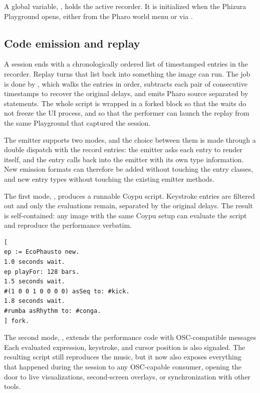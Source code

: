 \documentclass[
]{ceurart}
\begin{document}
A global variable, , holds the active recorder.
It is initialized when the Phizura Playground opens, either from the Pharo world menu or via .

\subsection{Code emission and replay}

A session ends with a chronologically ordered list of timestamped entries in the recorder.
Replay turns that list back into something the image can run.
The job is done by , which walks the entries in order, subtracts each pair of consecutive timestamps to recover the original delays, and emits Pharo source separated by  statements.
The whole script is wrapped in a forked block so that the waits do not freeze the UI process, and so that the performer can launch the replay from the same Playground that captured the session.

The emitter supports two modes, and the choice between them is made through a double dispatch with the record entries: the emitter asks each entry to render itself, and the entry calls back into the emitter with its own type information.
New emission formats can therefore be added without touching the entry classes, and new entry types without touching the existing emitter methods.

The first mode, , produces a runnable Coypu script.
Keystroke entries are filtered out and only the evaluations remain, separated by the original delays.
The result is self-contained: any image with the same Coypu setup can evaluate the script and reproduce the performance verbatim.

\begin{lstlisting}[label={lst:emitted-performance},caption={Example of emitted performance code}]
[
ep := EcoPhausto new.
1.0 seconds wait.
ep playFor: 128 bars.
1.5 seconds wait.
#(1 0 0 1 0 0 0 0) asSeq to: #kick.
1.8 seconds wait.
#rumba asRhythm to: #conga.
] fork.
\end{lstlisting}

The second mode, , extends the performance code with OSC-compatible messages
Each evaluated expression, keystroke, and cursor position is also signaled.
The resulting script still reproduces the music, but it now also exposes everything that happened during the session to any OSC-capable consumer, opening the door to live visualizations, second-screen overlays, or synchronization with other tools.
\end{document}
